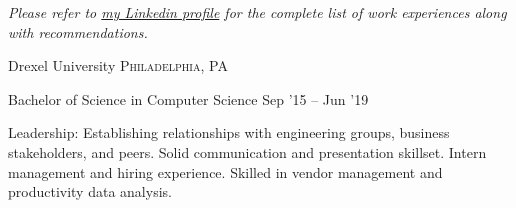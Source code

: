 \documentclass[10pt,a4paper]{article} %
\begin{document}

\begin{center}
\textit{Please refer to \href{https://www.linkedin.com/in/beefybeefy/}{my Linkedin profile} for the complete list of work experiences along with recommendations.}
\end{center}


\spacedhrule{-0.2em}{-0.4em} %



\headedsection %
{Drexel University}
{\textsc{Philadelphia, PA}} {

\headedsubsection %
{Bachelor of Science in Computer Science}
{Sep '15 -- Jun '19}
{}
}




\inlineheadsection %
{Leadership:}
{Establishing relationships with engineering groups, business stakeholders, and peers. Solid communication and presentation skillset. Intern management and hiring experience. Skilled in vendor management and productivity data analysis.}

\end{document}
